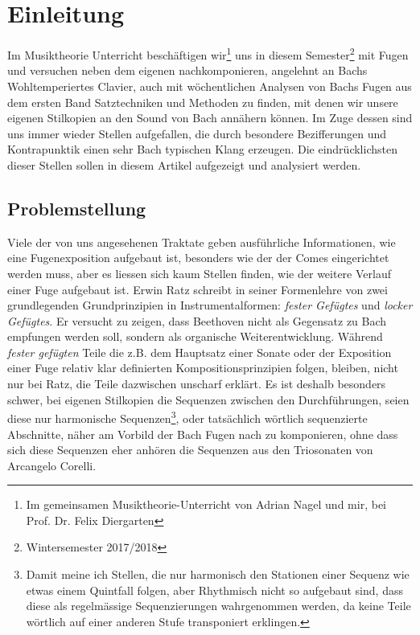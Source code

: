 \section{Einleitung}

Im Musiktheorie Unterricht beschäftigen wir\footnote{Im gemeinsamen Musiktheorie-Unterricht von Adrian Nagel und mir, bei Prof. Dr. Felix Diergarten} uns in diesem Semester\footnote{Wintersemester 2017/2018} mit Fugen und versuchen neben dem eigenen nachkomponieren, angelehnt an Bachs Wohltemperiertes Clavier, auch mit wöchentlichen Analysen von Bachs Fugen aus dem ersten Band Satztechniken und Methoden zu finden, mit denen wir unsere eigenen Stilkopien an den Sound von Bach annähern können.
Im Zuge dessen sind uns immer wieder Stellen aufgefallen, die durch besondere Bezifferungen und Kontrapunktik einen sehr Bach typischen Klang erzeugen.
Die eindrücklichsten dieser Stellen sollen in diesem Artikel aufgezeigt und analysiert werden.


\subsection{Problemstellung}

Viele der von uns angesehenen Traktate geben ausführliche Informationen, wie eine Fugenexposition aufgebaut ist, besonders wie der der Comes eingerichtet werden muss, aber es liessen sich kaum Stellen finden, wie der weitere Verlauf einer Fuge aufgebaut ist.
Erwin Ratz schreibt in seiner Formenlehre\autocite[21]{ratz:formenlehre} von zwei grundlegenden Grundprinzipien in Instrumentalformen: \emph{fester Gefügtes} und \emph{locker Gefügtes}.
Er versucht zu zeigen, dass Beethoven nicht als Gegensatz zu Bach empfungen werden soll, sondern als organische Weiterentwicklung.
Während \emph{fester gefügten} Teile die z.B. dem Hauptsatz einer Sonate oder der Exposition einer Fuge relativ klar definierten Kompositionsprinzipien folgen, bleiben, nicht nur bei Ratz, die Teile dazwischen unscharf erklärt.
Es ist deshalb besonders schwer, bei eigenen Stilkopien die Sequenzen zwischen den Durchführungen, seien diese nur harmonische Sequenzen\footnote{Damit meine ich Stellen, die nur harmonisch den Stationen einer Sequenz wie etwas einem Quintfall folgen, aber Rhythmisch nicht so aufgebaut sind, dass diese als regelmässige Sequenzierungen wahrgenommen werden, da keine Teile wörtlich auf einer anderen Stufe transponiert erklingen.}, oder tatsächlich wörtlich sequenzierte Abschnitte, näher am Vorbild der Bach Fugen nach zu komponieren, ohne dass sich diese Sequenzen eher anhören die Sequenzen aus den Triosonaten von Arcangelo Corelli.

